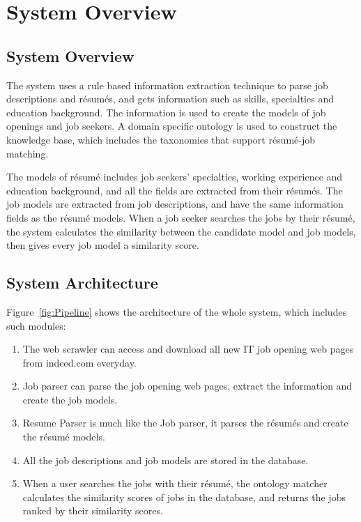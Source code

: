 \chapter{System Overview}

\section{System Overview}
The system uses a rule based information extraction technique to parse job descriptions and r\'esum\'es, and gets information such as skills, specialties and education background. The information is used to create the models of job openings and job seekers. A domain specific ontology is used to construct the knowledge base, which includes the taxonomies that support r\'esum\'e-job matching.

The models of r\'esum\'e includes job seekers' specialties, working experience and education background, and all the fields are extracted from their r\'esum\'es. The job models are extracted from job descriptions, and have the same information fields as the r\'esum\'e models.  When a job seeker searches the jobs by their r\'esum\'e, the system calculates the similarity between the candidate model and job models, then gives every job model a similarity score.

\section{System Architecture}

Figure~\ref{fig:Pipeline} shows the architecture of the whole system, which includes such modules:

\begin{enumerate}
    \item The web scrawler can access and download all new IT job opening web pages from indeed.com everyday.
    \item Job parser can parse the job opening web pages, extract the information and create the job models.
    \item Resume Parser is much like the Job parser, it parses the r\'esum\'es and create the r\'esum\'e models.
    \item All the job descriptions and job models are stored in the database.
    \item When a user searches  the jobs with their r\'esum\'e, the ontology matcher calculates the similarity scores of jobs in the database, and returns the jobs ranked by their similarity scores.
\end{enumerate}

